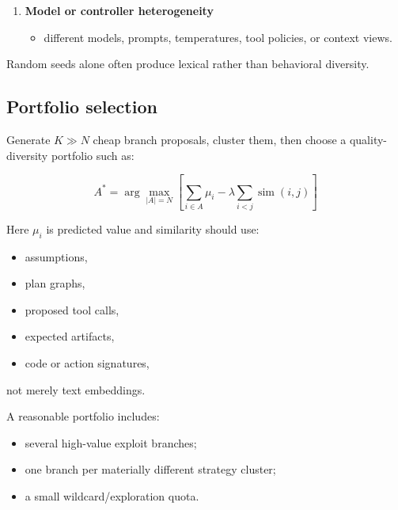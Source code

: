 \documentclass[
  letterpaper,
]{article}
\providecommand{\tightlist}{%
  \setlength{\itemsep}{0pt}\setlength{\parskip}{0pt}}
\begin{document}
\begin{enumerate}
  \begin{itemize}
  \tightlist
  \item
    expected artifact;
  \item
    expected test result;
  \item
    milestone and falsifier.
  \end{itemize}
\item
  \textbf{Model or controller heterogeneity}

  \begin{itemize}
  \tightlist
  \item
    different models, prompts, temperatures, tool policies, or context views.
  \end{itemize}
\end{enumerate}

Random seeds alone often produce lexical rather than behavioral diversity.

\subsection{Portfolio selection}\label{portfolio-selection}

Generate \(K\gg N\) cheap branch proposals, cluster them, then choose a quality-diversity portfolio such as:

\[
A^*=
\arg\max_{|A|=N}
\left[
\sum_{i\in A}\mu_i
-
\lambda\sum_{i<j}\operatorname{sim}(i,j)
\right]
\]

Here \(\mu_i\) is predicted value and similarity should use:

\begin{itemize}
\tightlist
\item
  assumptions,
\item
  plan graphs,
\item
  proposed tool calls,
\item
  expected artifacts,
\item
  code or action signatures,
\end{itemize}

not merely text embeddings.

A reasonable portfolio includes:

\begin{itemize}
\tightlist
\item
  several high-value exploit branches;
\item
  one branch per materially different strategy cluster;
\item
  a small wildcard/exploration quota.
\end{itemize}
\end{document}
